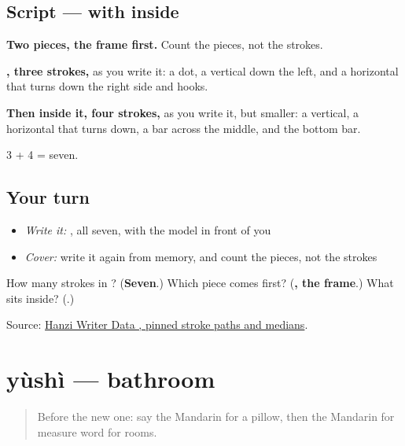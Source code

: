 \subsection*{Script —  with  inside}

\begin{quote}
\end{quote}

\textbf{Two pieces, the frame first.} Count the pieces, not the strokes.

\textbf{, three strokes,} as you write it: a dot, a vertical down the left, and a horizontal that turns down the right side and hooks.

\textbf{Then  inside it, four strokes,} as you write it, but smaller: a vertical, a horizontal that turns down, a bar across the middle, and the bottom bar.

3 + 4 = seven.

\subsection*{Your turn}
\begin{itemize}
\raggedright
  \item \emph{Write it:} , all seven, with the model in front of you
  \item \emph{Cover:} write it again from memory, and count the pieces, not the strokes
\end{itemize}

\begin{tcolorbox}[breakable,colback=teal!4,colframe=teal!35!black,title={Before you move on}]
How many strokes in ? (\textbf{Seven}.) Which piece comes first? (\textbf{, the frame}.) What sits inside? (\textbf{}.)

Source: \href{https://raw.githubusercontent.com/chanind/hanzi-writer-data/68d10a4b21150cae5e1ebbd223eed289cf32d90c/data/\%E9\%97\%B4.json}{Hanzi Writer Data , pinned stroke paths and medians}.
\end{tcolorbox}
\section[yùshì]{yùshì — bathroom}

\label{lesson:ZH-C181-yushi}



\begin{quote}
Before the new one: say the Mandarin for a pillow, then the Mandarin for measure word for rooms.
\end{quote}

